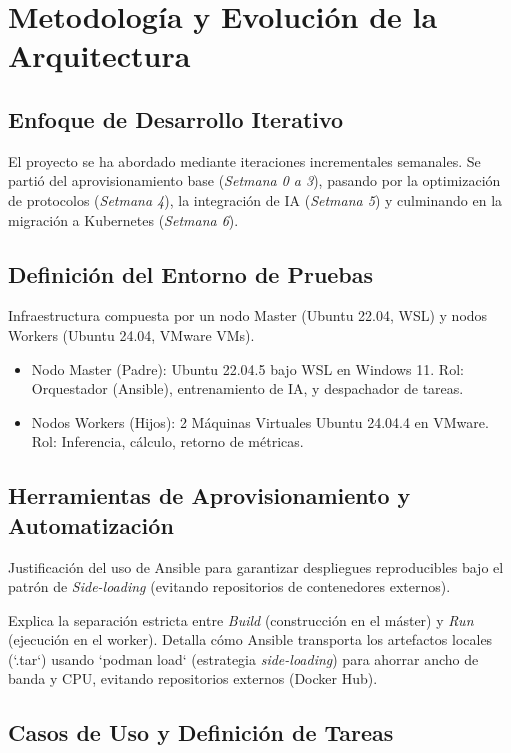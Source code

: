 \documentclass[11pt, a4paper]{report}
\begin{document}
\chapter{Metodología y Evolución de la Arquitectura}

\section{Enfoque de Desarrollo Iterativo}
El proyecto se ha abordado mediante iteraciones incrementales semanales. Se partió del aprovisionamiento base (\textit{Setmana 0 a 3}), pasando por la optimización de protocolos (\textit{Setmana 4}), la integración de IA (\textit{Setmana 5}) y culminando en la migración a Kubernetes (\textit{Setmana 6}).

\section{Definición del Entorno de Pruebas}
Infraestructura compuesta por un nodo Master (Ubuntu 22.04, WSL) y nodos Workers (Ubuntu 24.04, VMware VMs).

\begin{itemize}
    \item Nodo Master (Padre): Ubuntu 22.04.5 bajo WSL en Windows 11. Rol: Orquestador (Ansible), entrenamiento de IA, y despachador de tareas.
    \item Nodos Workers (Hijos): 2 Máquinas Virtuales Ubuntu 24.04.4 en VMware. Rol: Inferencia, cálculo, retorno de métricas.
\end{itemize}

\section{Herramientas de Aprovisionamiento y Automatización}
Justificación del uso de Ansible para garantizar despliegues reproducibles bajo el patrón de \textit{Side-loading} (evitando repositorios de contenedores externos).

Explica la separación estricta entre \textit{Build} (construcción en el máster) y \textit{Run} (ejecución en el worker). Detalla cómo Ansible transporta los artefactos locales (`.tar`) usando `podman load` (estrategia \textit{side-loading}) para ahorrar ancho de banda y CPU, evitando repositorios externos (Docker Hub).

\section{Casos de Uso y Definición de Tareas}
\end{document}
